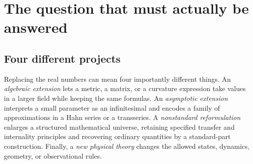 \documentclass[11pt,a4paper]{article}
\numberwithin{equation}{section}
\theoremstyle{definition}
\theoremstyle{remark}
\newcommand{\R}{\mathbb R}
\newcommand{\C}{\mathbb C}
\newcommand{\No}{\mathbf{No}}
\begin{document}
\begin{abstract}
Could Conway's surreal field $\No$, or its algebraic closure $\No[i]$, replace
$\R$ and $\C$ in theoretical physics, especially near a black-hole singularity?
The answer depends on what ``replace'' and ``resolve'' mean. Finite-dimensional
algebra, Lorentzian quadratic forms, and quantum-state algebra extend readily to
suitable real-closed coefficient fields. Differential equations, integration,
causal geometry, and quantum field theory require substantially more structure.
We explain the established surreal differential and integration theories without
conflating their distinct derivatives, summation rules, or domains of validity.

The Schwarzschild example is developed in invariant and proper-time variables.
At an infinitesimal radius its curvature is an exactly representable infinite
number, but its pole, finite infall time, and divergent tidal deformation remain.
A pole-persistence proposition makes the limited nature of scalar extension
precise. A formal reduction theorem shows that an infinitesimal deformation of a
nondegenerate metric has the expected classical Einstein tensor as its zeroth
coefficient. Conversely, a boundary-layer example shows why pointwise standard
part alone cannot justify differentiating a limiting metric. A Hayward-type core
provides an explicit matched-asymptotic test: Hahn summability correctly selects
inner and outer regimes, but does not select or physically justify the modified
metric. We also prove finite-dimensional quantum shadow results and exhibit an
incompatibility between the canonical integer-part global phase and the
Berarducci--Mantova scalar derivation. These results support surreal methods as
a rigorous asymptotic language, not a demonstrated singularity cure or a
validated fundamental scalar replacement.
\end{abstract}

\tableofcontents
\clearpage

\section{The question that must actually be answered}\label{sec:question}

\subsection{Four different projects}
Replacing the real numbers can mean four importantly different things. An
\emph{algebraic extension} lets a metric, a matrix, or a curvature expression take
values in a larger field while keeping the same formulas. An \emph{asymptotic
extension} interprets a small parameter as an infinitesimal and encodes a family
of approximations in a Hahn series or a transseries. A \emph{nonstandard
reformulation} enlarges a structured mathematical universe, retaining specified
transfer and internality principles and recovering ordinary quantities by a
standard-part construction. Finally, a \emph{new physical theory} changes the
allowed states, dynamics, geometry, or observational rules.
\end{document}
